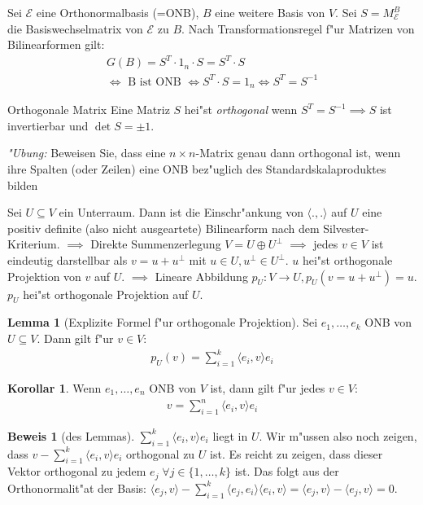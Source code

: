 \documentclass[oneside,fontsize=11pt,paper=a4,BCOR=0mm,DIV=12,automark,headsepline]{scrbook}
\theoremstyle{remark}
\theoremstyle{definition}
\newtheorem{lemma}{Lemma}[section]
\newtheorem*{korollar}{Korollar}
\theoremstyle{definition}
\newtheorem*{prof}{Beweis}
\theoremstyle{remark}
\begin{document}
\begin{relation}
  Sei $\mathcal{E}$ eine Orthonormalbasis (=ONB), $B$ eine weitere Basis von $V$. Sei
  $S=M^B_\mathcal{E}$ die Basiswechselmatrix von $\mathcal{E}$ zu $B$. Nach
  Transformationsregel f"ur Matrizen von Bilinearformen gilt:
  \begin{align*}
    G(B) =  S^T\cdot 1_n \cdot S = S^T\cdot S\\
    \iff \text{ B ist ONB } \iff S^T\cdot S = 1_n \iff S^T = S^{-1}
  \end{align*}
\end{relation}

\begin{definition}{Orthogonale Matrix}
  Eine Matriz $S$ hei"st \emph{orthogonal} wenn $S^T=S^{-1} \implies S$  ist
  invertierbar und $\det S = \pm 1$.
\end{definition}

\emph{"Ubung:} Beweisen Sie, dass eine \(n\times n\)-Matrix genau dann orthogonal ist, wenn ihre Spalten (oder Zeilen) eine ONB bez"uglich des Standardskalaproduktes bilden

Sei \(U\subseteq V\) ein Unterraum. Dann ist die Einschr"ankung von \(\langle ., .\rangle\) auf \(U\) eine positiv definite (also nicht ausgeartete) Bilinearform nach dem Silvester-Kriterium. \(\implies\) Direkte Summenzerlegung \(V = U\oplus U^\perp\) \(\implies\) jedes \(v\in V\) ist eindeutig darstellbar als \(v = u + u^\perp\) mit \(u\in U, u^\perp \in U^\perp\). \(u\) hei"st orthogonale Projektion von \(v\) auf \(U\). \(\implies\) Lineare Abbildung \(p_U: V\to U, p_U(v = u + u^\perp) = u\). \(p_U\) hei"st orthogonale Projektion auf \(U\).

\begin{lemma}[Explizite Formel f"ur orthogonale Projektion]
  Sei \(e_1, \dots, e_k\) ONB von \(U \subseteq V\). Dann gilt f"ur \(v\in V\):
  \begin{align*}
    p_U(v) = \sum_{i=1}^k\langle e_i, v\rangle e_i
  \end{align*}
\end{lemma}
\begin{korollar}
  Wenn \(e_1,\dots, e_n\) ONB von \(V\) ist, dann gilt f"ur jedes \(v \in V\):
  \begin{align*}
    v = \sum_{i=1}^n\langle e_i, v\rangle e_i
  \end{align*}
\end{korollar}
\begin{prof}[des Lemmas]
  \(\sum_{i=1}^k \langle e_i, v\rangle e_i\) liegt in \(U\). Wir m"ussen also noch zeigen, dass \(v - \sum_{i=1}^k\langle e_i, v\rangle e_i\) orthogonal zu \(U\) ist. Es reicht zu zeigen, dass dieser Vektor orthogonal zu jedem \(e_j \;\forall j \in \{1,\dots, k\}\) ist. Das folgt aus der Orthonormalit"at der Basis: \(\langle e_j, v\rangle - \sum_{i=1}^k \langle e_j, e_i\rangle\langle e_i, v\rangle = \langle e_j, v\rangle - \langle e_j, v\rangle = 0\).
\end{prof}
\end{document}
